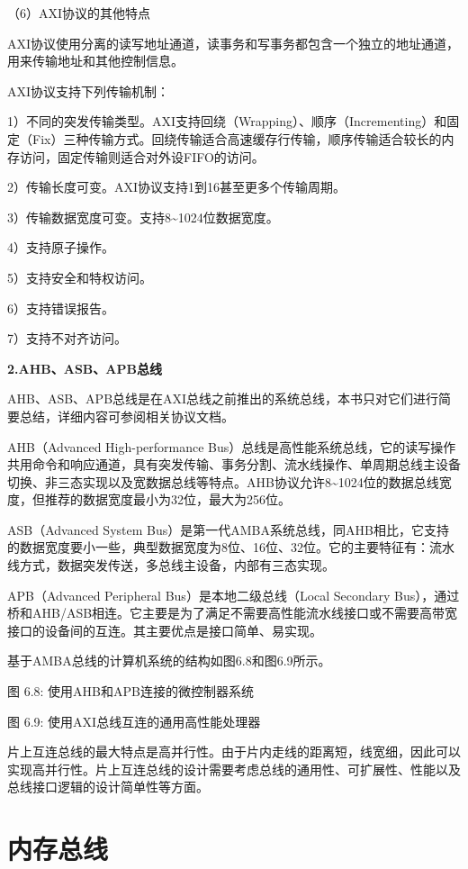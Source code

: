 \documentclass[]{ctexbook}
\begin{document}
（6）AXI协议的其他特点

AXI协议使用分离的读写地址通道，读事务和写事务都包含一个独立的地址通道，用来传输地址和其他控制信息。

AXI协议支持下列传输机制：

1）不同的突发传输类型。AXI支持回绕（Wrapping）、顺序（Incrementing）和固定（Fix）三种传输方式。回绕传输适合高速缓存行传输，顺序传输适合较长的内存访问，固定传输则适合对外设FIFO的访问。

2）传输长度可变。AXI协议支持1到16甚至更多个传输周期。

3）传输数据宽度可变。支持8\textasciitilde1024位数据宽度。

4）支持原子操作。

5）支持安全和特权访问。

6）支持错误报告。

7）支持不对齐访问。

\textbf{2.AHB、ASB、APB总线}

AHB、ASB、APB总线是在AXI总线之前推出的系统总线，本书只对它们进行简要总结，详细内容可参阅相关协议文档。

AHB（Advanced High-performance Bus）总线是高性能系统总线，它的读写操作共用命令和响应通道，具有突发传输、事务分割、流水线操作、单周期总线主设备切换、非三态实现以及宽数据总线等特点。AHB协议允许8\textasciitilde1024位的数据总线宽度，但推荐的数据宽度最小为32位，最大为256位。

ASB（Advanced System Bus）是第一代AMBA系统总线，同AHB相比，它支持的数据宽度要小一些，典型数据宽度为8位、16位、32位。它的主要特征有：流水线方式，数据突发传送，多总线主设备，内部有三态实现。

APB（Advanced Peripheral Bus）是本地二级总线（Local Secondary Bus），通过桥和AHB/ASB相连。它主要是为了满足不需要高性能流水线接口或不需要高带宽接口的设备间的互连。其主要优点是接口简单、易实现。

基于AMBA总线的计算机系统的结构如图6.8和图6.9所示。

图 6.8: 使用AHB和APB连接的微控制器系统

图 6.9: 使用AXI总线互连的通用高性能处理器

片上互连总线的最大特点是高并行性。由于片内走线的距离短，线宽细，因此可以实现高并行性。片上互连总线的设计需要考虑总线的通用性、可扩展性、性能以及总线接口逻辑的设计简单性等方面。

\hypertarget{ux5185ux5b58ux603bux7ebf}{%
\section{内存总线}\label{ux5185ux5b58ux603bux7ebf}}
\end{document}
